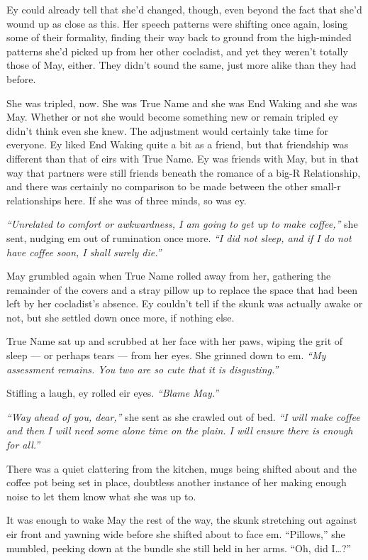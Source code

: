 Ey could already tell that she'd changed, though, even beyond the fact that she'd wound up as close as this. Her speech patterns were shifting once again, losing some of their formality, finding their way back to ground from the high-minded patterns she'd picked up from her other cocladist, and yet they weren't totally those of May, either. They didn't sound the same, just more alike than they had before.

She was tripled, now. She was True Name and she was End Waking and she was May. Whether or not she would become something new or remain tripled ey didn't think even she knew. The adjustment would certainly take time for everyone. Ey liked End Waking quite a bit as a friend, but that friendship was different than that of eirs with True Name. Ey was friends with May, but in that way that partners were still friends beneath the romance of a big-R Relationship, and there was certainly no comparison to be made between the other small-r relationships here. If she was of three minds, so was ey.

\emph{``Unrelated to comfort or awkwardness, I am going to get up to make coffee,''} she sent, nudging em out of rumination once more. \emph{``I did not sleep, and if I do not have coffee soon, I shall surely die.''}

May grumbled again when True Name rolled away from her, gathering the remainder of the covers and a stray pillow up to replace the space that had been left by her cocladist's absence. Ey couldn't tell if the skunk was actually awake or not, but she settled down once more, if nothing else.

True Name sat up and scrubbed at her face with her paws, wiping the grit of sleep — or perhaps tears — from her eyes. She grinned down to em. \emph{``My assessment remains. You two are so cute that it is disgusting.''}

Stifling a laugh, ey rolled eir eyes. \emph{``Blame May.''}

\emph{``Way ahead of you, dear,''} she sent as she crawled out of bed. \emph{``I will make coffee and then I will need some alone time on the plain. I will ensure there is enough for all.''}

There was a quiet clattering from the kitchen, mugs being shifted about and the coffee pot being set in place, doubtless another instance of her making enough noise to let them know what she was up to.

It was enough to wake May the rest of the way, the skunk stretching out against eir front and yawning wide before she shifted about to face em. ``Pillows,'' she mumbled, peeking down at the bundle she still held in her arms. ``Oh, did I\ldots?''

